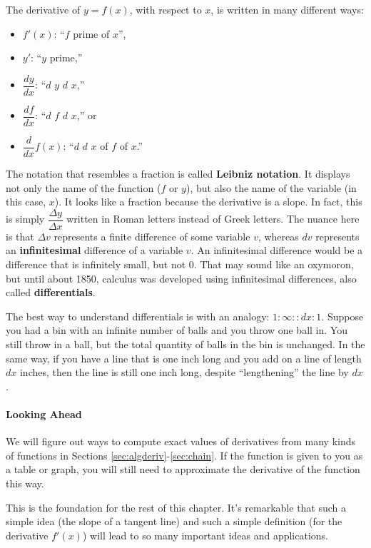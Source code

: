 The derivative of $y=f(x)$, with respect to $x$, is written in many different ways:
\begin{itemize}
    \item $f'(x)$: ``$f$ prime of $x$'',
    \item $y'$: ``$y$ prime,''
    \item $\dfrac{dy}{dx}$: ``$d$ $y$ $d$ $x$,''  
    \item $\dfrac{df}{dx}$: ``$d$ $f$ $d$ $x$,'' or
    \item $\dfrac{d}{dx}f(x)$: ``$d$ $d$ $x$ of $f$ of $x$.''
\end{itemize}
The notation that resembles a fraction is called {\bf Leibniz notation}. It displays not only the name of the function ($f$ or $y$), but also the name of the variable (in this case, $x$). It looks like a fraction because the derivative is a slope. In fact, this is simply $\dfrac{\Delta y}{\Delta x}$ written in Roman letters instead of Greek letters. The nuance here is that $\Delta v$ represents a finite difference of some variable $v$, whereas $dv$ represents an {\bf infinitesimal} difference of a variable $v$. An infinitesimal difference would be a difference that is infinitely small, but not 0. That may sound like an oxymoron, but until about 1850, calculus was developed using infinitesimal differences, also called {\bf differentials}. 

The best way to understand differentials is with an analogy: $1:\infty::dx:1$. Suppose you had a bin with an infinite number of balls and you throw one ball in. You still throw in a ball, but the total quantity of balls in the bin is unchanged. In the same way, if you have a line that is one inch long and you add on a line of length $dx$ inches, then the line is still one inch long, despite ``lengthening'' the line by $dx$.
 
\paragraph*{Looking Ahead}
We will figure out ways to compute exact values of derivatives from many kinds of functions in Sections \ref{sec:algderiv}-\ref{sec:chain}. If the function is given to you as a table or graph, you will still need to approximate the derivative of the function this way.

This is the foundation for the rest of this chapter. It's remarkable that such a simple idea (the slope of a tangent line) and such a simple definition (for the derivative $f'(x)$) will lead to so many important ideas and applications.

